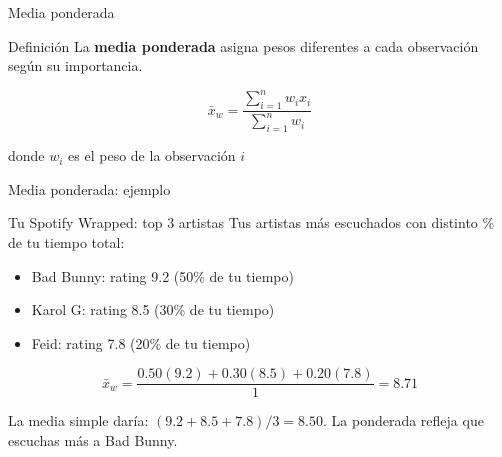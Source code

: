 \documentclass[aspectratio=169, 11pt]{beamer}
\begin{document}
\begin{frame}{Media ponderada}
\begin{block}{Definición}
La \textbf{media ponderada} asigna pesos diferentes a cada observación según su importancia.
\end{block}

\[
\bar{x}_w = \frac{\sum_{i=1}^n w_i x_i}{\sum_{i=1}^n w_i}
\]

donde $w_i$ es el peso de la observación $i$
\end{frame}

\begin{frame}{Media ponderada: ejemplo}
\begin{exampleblock}{Tu Spotify Wrapped: top 3 artistas}
Tus artistas m\'as escuchados con distinto \% de tu tiempo total:
\begin{itemize}
\item Bad Bunny: rating 9.2 (50\% de tu tiempo)
\item Karol G: rating 8.5 (30\% de tu tiempo)
\item Feid: rating 7.8 (20\% de tu tiempo)
\end{itemize}
\[
\bar{x}_w = \frac{0.50(9.2) + 0.30(8.5) + 0.20(7.8)}{1} = 8.71
\]
\end{exampleblock}

\vspace{0.5em}
\alert{La media simple dar\'ia}: $(9.2 + 8.5 + 7.8)/3 = 8.50$. La ponderada refleja que escuchas m\'as a Bad Bunny.
\end{frame}
\end{document}

